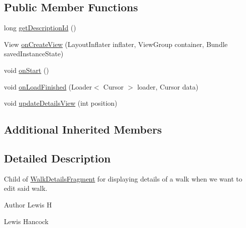 \subsection*{Public Member Functions}
\begin{DoxyCompactItemize}
\item 
long \hyperlink{classuk_1_1ac_1_1swan_1_1digitaltrails_1_1fragments_1_1_edit_walk_fragment_a5d529fb60421b2e55446ff158ff3988f}{get\+Description\+Id} ()
\item 
View \hyperlink{classuk_1_1ac_1_1swan_1_1digitaltrails_1_1fragments_1_1_edit_walk_fragment_a5d2cda3440bd1606c439d32ce2606c85}{on\+Create\+View} (Layout\+Inflater inflater, View\+Group container, Bundle saved\+Instance\+State)
\item 
void \hyperlink{classuk_1_1ac_1_1swan_1_1digitaltrails_1_1fragments_1_1_edit_walk_fragment_a22017e0d44ca0d9153ce181b75827536}{on\+Start} ()
\item 
void \hyperlink{classuk_1_1ac_1_1swan_1_1digitaltrails_1_1fragments_1_1_edit_walk_fragment_abcac454bb1546a8846e218f280b0eaf5}{on\+Load\+Finished} (Loader$<$ Cursor $>$ loader, Cursor data)
\item 
void \hyperlink{classuk_1_1ac_1_1swan_1_1digitaltrails_1_1fragments_1_1_edit_walk_fragment_aeea5a4bd3b3bba9c0c7a837cceae587e}{update\+Details\+View} (int position)
\end{DoxyCompactItemize}
\subsection*{Additional Inherited Members}


\subsection{Detailed Description}
Child of \hyperlink{classuk_1_1ac_1_1swan_1_1digitaltrails_1_1fragments_1_1_walk_details_fragment}{Walk\+Details\+Fragment} for displaying details of a walk when we want to edit said walk. 

\begin{DoxyAuthor}{Author}
Lewis H 

Lewis Hancock 
\end{DoxyAuthor}


